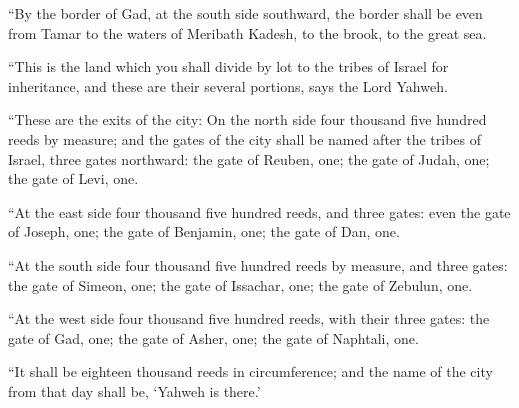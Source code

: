  ``By the border of Gad, at the south side southward, the
border shall be even from Tamar to the waters of Meribath Kadesh, to the
brook, to the great sea.

 ``This is the land which you shall divide by lot to the
tribes of Israel for inheritance, and these are their several portions,
says the Lord Yahweh.

 ``These are the exits of the city: On the north side four
thousand five hundred reeds by measure;  and the gates of
the city shall be named after the tribes of Israel, three gates
northward: the gate of Reuben, one; the gate of Judah, one; the gate of
Levi, one.

 ``At the east side four thousand five hundred reeds, and
three gates: even the gate of Joseph, one; the gate of Benjamin, one;
the gate of Dan, one.

 ``At the south side four thousand five hundred reeds by
measure, and three gates: the gate of Simeon, one; the gate of Issachar,
one; the gate of Zebulun, one.

 ``At the west side four thousand five hundred reeds, with
their three gates: the gate of Gad, one; the gate of Asher, one; the
gate of Naphtali, one.

 ``It shall be eighteen thousand reeds in circumference;
and the name of the city from that day shall be, `Yahweh is there.'
